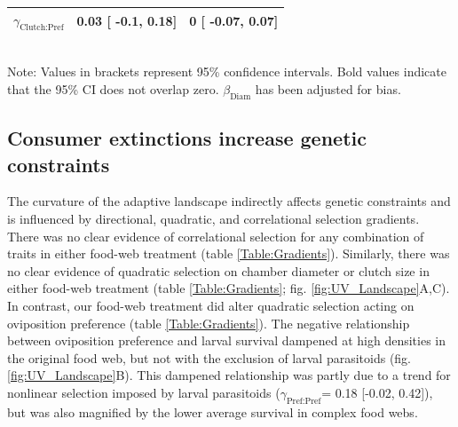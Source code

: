 \documentclass[11pt,]{article}
\begin{document}
\begin{table}[h]
\begin{tabular}{lcc}

$\gamma_{\text{Clutch:Pref}}$ & 
0.03 [
-0.1,
0.18] & 

0 [
-0.07,
0.07] \\%

\hline
\end{tabular}
\bigskip{}
\\
{\footnotesize Note: Values in brackets represent 95\% confidence intervals. Bold values indicate that the 95\% CI does not overlap zero. $\beta_{\text{Diam}}$ has been adjusted for bias.}
\end{table}

\subsection{Consumer extinctions increase genetic
constraints}\label{consumer-extinctions-increase-genetic-constraints}

\indent The curvature of the adaptive landscape indirectly affects
genetic constraints and is influenced by directional, quadratic, and
correlational selection gradients. There was no clear evidence of
correlational selection for any combination of traits in either food-web
treatment (table \ref{Table:Gradients}). Similarly, there was no clear
evidence of quadratic selection on chamber diameter or clutch size in
either food-web treatment (table \ref{Table:Gradients}; fig.
\ref{fig:UV_Landscape}A,C). In contrast, our food-web treatment did
alter quadratic selection acting on oviposition preference (table
\ref{Table:Gradients}). The negative relationship between oviposition
preference and larval survival dampened at high densities in the
original food web, but not with the exclusion of larval parasitoids
(fig. \ref{fig:UV_Landscape}B). This dampened relationship was partly
due to a trend for nonlinear selection imposed by larval parasitoids
(\(\gamma_{\text{Pref:Pref}}\)= 0.18 {[}-0.02, 0.42{]}), but was also
magnified by the lower average survival in complex food webs.
\end{document}
